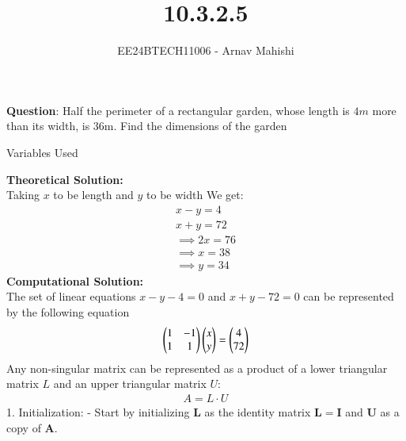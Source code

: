 \documentclass[journal]{IEEEtran}
\begin{document}

\vspace{3cm}

\title{10.3.2.5}
\author{EE24BTECH11006 - Arnav Mahishi}
{\let\newpage\relax\maketitle}

\renewcommand{\thefigure}{\theenumi}
\renewcommand{\thetable}{\theenumi}
\setlength{\intextsep}{10pt} %


\renewcommand{\thetable}{\theenumi}


\textbf{Question}:\newline
Half the perimeter of a rectangular garden, whose length is $4m$ more than its width, is $36$m. Find the dimensions of the garden
\newline
\begin{table}[h!]    
  \centering
  
  \caption{Variables Used}
  \label{tab1.1.2.2}
\end{table}
\newline
\textbf{Theoretical Solution:}\\
Taking $x$ to be length and $y$ to be width
We get:
\begin{align}
    x-y=4\\
    x+y=72\\
    \implies 2x=76\\
    \implies x=38\\
    \implies y=34
\end{align}
\textbf{Computational Solution:}\\
The set of linear equations $x-y-4=0$ and $x+y-72=0$ can be represented by the following equation
\begin{align}
    \begin{pmatrix}1&-1\\1&1\end{pmatrix}\begin{pmatrix}x\\y\end{pmatrix}=\begin{pmatrix}4\\72\end{pmatrix}
\end{align}
Any non-singular matrix can be represented as a product of a lower triangular matrix $L$ and an
upper triangular matrix $U$:
\begin{align}
    A = L \cdot U
\end{align}
1. Initialization: 
   - Start by initializing $ \mathbf{L} $ as the identity matrix $ \mathbf{L} = \mathbf{I} $ and $ \mathbf{U} $ as a copy of $ \mathbf{A} $.
   
\end{document}
